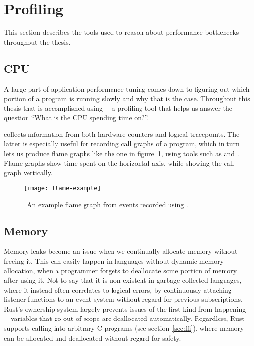 \section{Profiling}

This section describes the tools used to reason about performance bottlenecks
throughout the thesis.

\subsection{CPU}

A large part of application performance tuning comes down to figuring out which
portion of a program is running slowly and why that is the case. Throughout
this thesis that is accomplished using
---a profiling tool that helps us
answer the question ``What is the CPU spending time on?''.

 collects information from both hardware counters and logical
tracepoints. The latter is especially useful for recording call graphs of a
program, which in turn lets us produce flame graphs like the one in
figure~\ref{fig:flame-example}, using tools such as
 and
. Flame graphs show
time spent on the horizontal axis, while showing the call graph vertically.

\begin{figure}[H]
  \centering
  \texttt{[image: flame-example]}
  \caption{\
    An example flame graph from events recorded using .
  }\label{fig:flame-example}
\end{figure}

\subsection{Memory}

Memory leaks become an issue when we continually allocate memory without freeing
it. This can easily happen in languages without dynamic memory allocation, when
a programmer forgets to deallocate some portion of memory after using it. Not to
say that it is non-existent in garbage collected languages, where it instead
often correlates to logical errors, \eg by continuously attaching listener
functions to an event system without regard for previous subscriptions. Rust's
ownership system largely prevents issues of the first kind from
happening---variables that go out of scope are deallocated automatically.
Regardless, Rust supports calling into arbitrary C-programs (see
section~\ref{sec:ffi}), where memory can be allocated and deallocated without
regard for safety.

